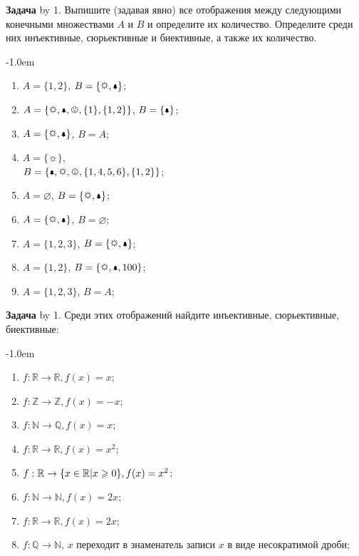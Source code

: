 \documentclass[a4paper,10pt]{article}
\def\problem{\textbf{Задача \the\problemnum}\advance\problemnum by 1}
\begin{document}
\problem. Выпишите (задавая явно) все отображения между следующими конечными множествами $A$ и $B$ и определите их количество. Определите среди них инъективные, сюрьективные и биективные, а также их количество. \par\kern-1.0em

\begin{multicols}{3}
	\begin{enumerate}[label=(\arabic*)\,]
		\item $A=\{1,2\}$, $B=\{\sun,\bell\}$;
		\item $A=\{\sun,\bell,\smiley, \{1\}, \{1,2\}\}$, $B=\{\bell\}$;
		\item $A=\{\sun,\bell\}$, $B=A$;
		\item $A=\{\sun\}$,\\ $B=\{\bell,\sun,\smiley, \{1,4,5,6\}, \{1,2\}\}$;
		\item $A=\varnothing$, $B=\{\sun,\bell\}$;
		\item $A=\{\sun,\bell\}$, $B=\varnothing$;
		\item $A=\{1,2,3\}$, $B=\{\sun,\bell\}$;
		\item $A=\{1,2\}$, $B=\{\sun,\bell,100\}$;
		\item $A=\{1,2,3\}$, $B=A$;
	\end{enumerate}
\end{multicols}

\problem. Среди этих отображений найдите инъективные, сюрьективные, биективные: \par\kern-1.0em
\begin{multicols}{3}
	\begin{enumerate}[label=(\arabic*)\,]
		\item $f:\mathbb R\to\mathbb R, f(x)=x$;
		\item $f:\mathbb Z\to\mathbb Z, f(x)=-x$;
		\item $f:\mathbb N\to\mathbb Q, f(x)=x$;
		\item $f:\mathbb R\to\mathbb R, f(x)=x^2$;
		\item $f:\mathbb R\to\mathbb \{x\in\mathbb R|x\geqslant 0\}, f(x)=x^2$;
		\item $f:\mathbb N\to\mathbb N, f(x)=2x$;
		\item $f:\mathbb R\to\mathbb R, f(x)=2x$;
		\item $f:\mathbb Q\to\mathbb N$, $x$ переходит в знаменатель записи $x$ в виде несократимой дроби;
	\end{enumerate}
\end{multicols}
\end{document}
